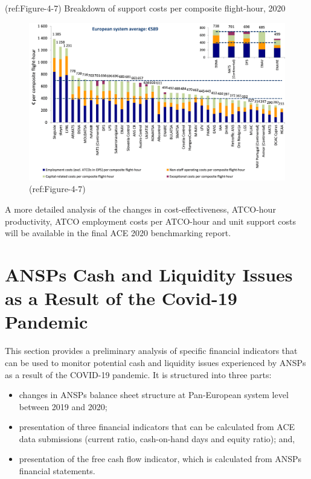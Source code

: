 \documentclass[
]{book}
\providecommand{\tightlist}{%
  \setlength{\itemsep}{0pt}\setlength{\parskip}{0pt}}
\begin{document}
(ref:Figure-4-7) Breakdown of support costs per composite flight-hour,
2020

\begin{figure}

{\centering \includegraphics[width=0.8\linewidth]{figures/Figure-4-7} 

}

\caption{(ref:Figure-4-7)}\label{fig:Figure-4-7}
\end{figure}

A more detailed analysis of the changes in cost-effectiveness, ATCO-hour
productivity, ATCO employment costs per ATCO-hour and unit support costs
will be available in the final ACE 2020 benchmarking report.

\hypertarget{covid}{%
\chapter{ANSPs Cash and Liquidity Issues as a Result of the Covid-19
Pandemic}\label{covid}}

This section provides a preliminary analysis of specific financial
indicators that can be used to monitor potential cash and liquidity
issues experienced by ANSPs as a result of the COVID-19 pandemic. It is
structured into three parts:

\begin{itemize}
\tightlist
\item
  changes in ANSPs balance sheet structure at Pan-European system level
  between 2019 and 2020;
\item
  presentation of three financial indicators that can be calculated from
  ACE data submissions (current ratio, cash-on-hand days and equity
  ratio); and,
\item
  presentation of the free cash flow indicator, which is calculated from
  ANSPs financial statements.
\end{itemize}
\end{document}
